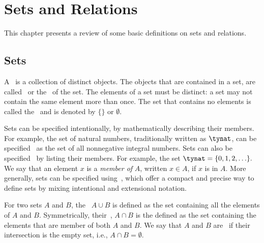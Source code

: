 \chapter{Sets and Relations}
\label{ch:bg::sets-and-relations}

\begin{preamble}
This chapter presents a review of some basic definitions on sets and
relations.
\end{preamble}

\section{Sets}
\label{sec:bg::sets}


\begin{gram}
A~ is a collection of distinct objects.  The objects that
are contained in a set, are called~ or
the~ of the set.  The elements of a set must be
distinct: a set may not contain the same element more than once. The
set that contains no elements is called the~ and is
denoted by $\{\}$ or $\emptyset$.
\end{gram}

\begin{gram}
Sets can be specified intentionally, by mathematically describing
their members.
%
For example, the set of natural numbers, traditionally written as
$\tynat$, can be specified~ as the set of all
nonnegative integral numbers.
%
Sets can also be specified~ by listing their members.
For example, the set $\tynat = \{0, 1, 2, \ldots\}.$
%
We say that an element $x$ is a {\em member of} $A$, written $x \in
A$, if $x$ is in $A$.  
%
More generally, sets can be specified using~,
which offer a compact and precise way to define sets by mixing
intentional and extensional notation.
\end{gram}

\begin{definition}
For two sets $A$ and $B$, the~ $A \cup B$ is defined as
the set containing all the elements of $A$ and $B$.  Symmetrically,
their~, $A \cap B$ is the defined as the set
containing the elements that are member of both $A$ and $B$.
% 
We say that $A$ and $B$ are~ if their intersection is
the empty set, i.e., $A \cap B = \emptyset$.
%
\end{definition}

